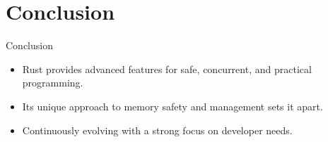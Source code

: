 \documentclass{beamer}
\begin{document}
\section{Conclusion}
\begin{frame}{Conclusion}
\begin{itemize}
  \item Rust provides advanced features for safe, concurrent, and practical programming.
  \item Its unique approach to memory safety and management sets it apart.
  \item Continuously evolving with a strong focus on developer needs.
\end{itemize}
\end{frame}
\end{document}
